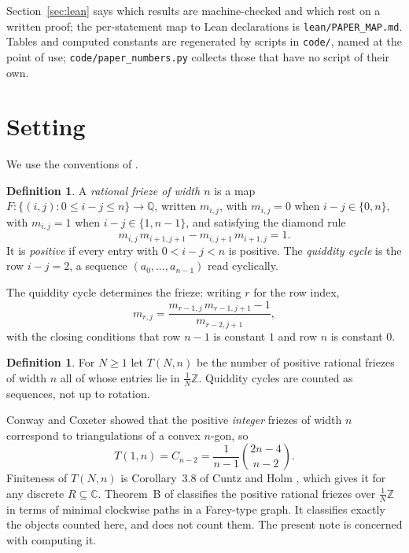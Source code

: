 \documentclass[11pt]{article}
\theoremstyle{plain}
\theoremstyle{definition}
\newtheorem{definition}[theorem]{Definition}
\newcommand{\Z}{\mathbb{Z}}
\newcommand{\Q}{\mathbb{Q}}
\newcommand{\C}{\mathbb{C}}
\newcommand{\lat}{\tfrac{1}{N}\Z}
\begin{document}
Section~\ref{sec:lean} says which results are machine-checked and which rest on a written
proof; the per-statement map to Lean declarations is \texttt{lean/PAPER\_MAP.md}. Tables and computed constants are regenerated by scripts in \texttt{code/}, named at the
point of use; \texttt{code/paper\_numbers.py} collects those that have no script of their
own.

\section{Setting}\label{sec:setting}

We use the conventions of \cite{KSSZ}.

\begin{definition}\label{def:frieze}
A \emph{rational frieze of width $n$} is a map
$F\colon\{(i,j): 0 \le i-j \le n\}\to\Q$, written $m_{i,j}$, with $m_{i,j}=0$ when
$i-j\in\{0,n\}$, with $m_{i,j}=1$ when $i-j\in\{1,n-1\}$, and satisfying the diamond rule
\[
  m_{i,j}\,m_{i+1,j+1}-m_{i,j+1}\,m_{i+1,j}=1 .
\]
It is \emph{positive} if every entry with $0<i-j<n$ is positive. The \emph{quiddity cycle}
is the row $i-j=2$, a sequence $(a_0,\dots,a_{n-1})$ read cyclically.
\end{definition}

The quiddity cycle determines the frieze: writing $r$ for the row index,
\begin{equation}\label{eq:rec}
  m_{r,j}=\frac{m_{r-1,j}\,m_{r-1,j+1}-1}{m_{r-2,j+1}},
\end{equation}
with the closing conditions that row $n-1$ is constant $1$ and row $n$ is constant $0$.

\begin{definition}\label{def:count}
For $N\ge 1$ let $T(N,n)$ be the number of positive rational friezes of width $n$ all of
whose entries lie in $\lat$. Quiddity cycles are counted as sequences, not up to rotation.
\end{definition}

Conway and Coxeter \cite{CC} showed that the positive \emph{integer} friezes of width $n$
correspond to triangulations of a convex $n$-gon, so
\begin{equation}\label{eq:catalan}
  T(1,n)=C_{n-2}=\frac{1}{n-1}\binom{2n-4}{n-2}.
\end{equation}
Finiteness of $T(N,n)$ is Corollary~3.8 of Cuntz and Holm \cite{CH19}, which gives it for any
discrete $R\subseteq\C$. Theorem~B of \cite{KSSZ} classifies the positive rational friezes
over $\lat$ in terms of minimal clockwise paths in a Farey-type graph. It classifies exactly
the objects counted here, and does not count them.
The present note is concerned with computing it.
\end{document}
